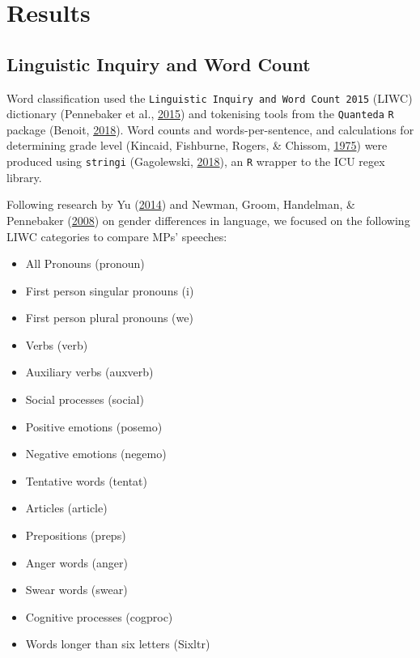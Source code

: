 \documentclass[]{article}
\providecommand{\tightlist}{%
  \setlength{\itemsep}{0pt}\setlength{\parskip}{0pt}}
\begin{document}
\hypertarget{results}{%
\section{Results}\label{results}}

\hypertarget{linguistic-inquiry-and-word-count}{%
\subsection{Linguistic Inquiry and Word
Count}\label{linguistic-inquiry-and-word-count}}

Word classification used the
\texttt{Linguistic\ Inquiry\ and\ Word\ Count\ 2015} (LIWC) dictionary
(Pennebaker et al., \protect\hyperlink{ref-pennebaker2015}{2015}) and
tokenising tools from the \texttt{Quanteda} \texttt{R} package (Benoit,
\protect\hyperlink{ref-benoit2018}{2018}). Word counts and
words-per-sentence, and calculations for determining grade level
(Kincaid, Fishburne, Rogers, \& Chissom,
\protect\hyperlink{ref-kincaid1975}{1975}) were produced using
\texttt{stringi} (Gagolewski,
\protect\hyperlink{ref-gagolewski2018}{2018}), an \texttt{R} wrapper to
the ICU regex library.

Following research by Yu (\protect\hyperlink{ref-yu2014}{2014}) and
Newman, Groom, Handelman, \& Pennebaker
(\protect\hyperlink{ref-newman2008}{2008}) on gender differences in
language, we focused on the following LIWC categories to compare MPs'
speeches:

\begin{itemize}
\tightlist
\item
  All Pronouns (pronoun)
\item
  First person singular pronouns (i) 
\item
  First person plural pronouns (we)
\item
  Verbs (verb)
\item
  Auxiliary verbs (auxverb) 
\item
  Social processes (social) 
\item
  Positive emotions (posemo) 
\item
  Negative emotions (negemo) 
\item
  Tentative words (tentat)
\item
  Articles (article) 
\item
  Prepositions (preps) 
\item
  Anger words (anger)
\item
  Swear words (swear)
\item
  Cognitive processes (cogproc)
\item
  Words longer than six letters (Sixltr)
\end{itemize}
\end{document}
